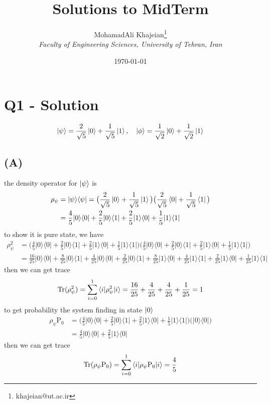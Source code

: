 \documentclass{article}
\title{\textbf{Solutions to MidTerm}}
\author{
    MohamadAli Khajeian\footnote{khajeian@ut.ac.ir} \\ 
    \small \textit{Faculty of Engineering Sciences, University of Tehran, Iran} \\ 
}
\date{\today}
\newcommand{\op}[2]{|#1\rangle \langle#2|}
\newcommand{\sand}[3]{\braket{#1 | #2 | #3}}
\begin{document}
\maketitle

\section*{Q1 - Solution}
\begin{align*}
   \ket{\psi} = \frac{2}{\sqrt{5}}\ket{0} + \frac{1}{\sqrt{5}}\ket{1},\quad \ket{\phi} = \frac{1}{\sqrt{2}}\ket{0} + \frac{1}{\sqrt{2}}\ket{1}
\end{align*}
\subsection*{(A)}
the density operator for $\ket{\psi}$ is
\begin{align*}
   \rho_{\psi} &= \op{\psi}{\psi} = \big(\frac{2}{\sqrt{5}}\ket{0} + \frac{1}{\sqrt{5}}\ket{1}\big)\big(\frac{2}{\sqrt{5}}\bra{0} + \frac{1}{\sqrt{5}}\bra{1}\big) \\
   &= \frac{4}{5}\op{0}{0} + \frac{2}{5}\op{0}{1} + \frac{2}{5}\op{1}{0} + \frac{1}{5}\op{1}{1}
\end{align*}
to show it is pure state, we have
\begin{align*}
   \rho^2_{\psi} &= \big(\frac{4}{5}\op{0}{0} + \frac{2}{5}\op{0}{1} + \frac{2}{5}\op{1}{0} + \frac{1}{5}\op{1}{1}\big)\big(\frac{4}{5}\op{0}{0} + \frac{2}{5}\op{0}{1} + \frac{2}{5}\op{1}{0} + \frac{1}{5}\op{1}{1}\big) \\
   &= \frac{16}{25}\op{0}{0} + \frac{8}{25}\op{0}{1} + \frac{4}{25}\op{0}{0} + \frac{2}{25}\op{0}{1} + \frac{8}{25}\op{1}{0} + \frac{4}{25}\op{1}{1} + \frac{2}{25}\op{1}{0} + \frac{1}{25}\op{1}{1}
\end{align*}
then we can get trace 
\begin{align*}
   \text{Tr}(\rho^2_{\psi}) = \sum_{i=0}^{1} \sand{i}{\rho^2_{\psi}}{i} = \frac{16}{25} + \frac{4}{25} + \frac{4}{25} + \frac{1}{25} = 1
\end{align*}
to get probability the system finding in state $\ket{0}$
\begin{align*}
   \rho_{\psi}\text{P}_{0} &= \big(\frac{4}{5}\op{0}{0} + \frac{2}{5}\op{0}{1} + \frac{2}{5}\op{1}{0} + \frac{1}{5}\op{1}{1}\big)\big(\op{0}{0}\big) \\
   &= \frac{4}{5}\op{0}{0} + \frac{2}{5}\op{1}{0}
\end{align*}
then we can get trace 
\begin{align*}
   \text{Tr}(\rho_{\psi}\text{P}_{0}) = \sum_{i=0}^{1} \sand{i}{\rho_{\psi}\text{P}_{0}}{i} = \frac{4}{5}
\end{align*}
\end{document}
